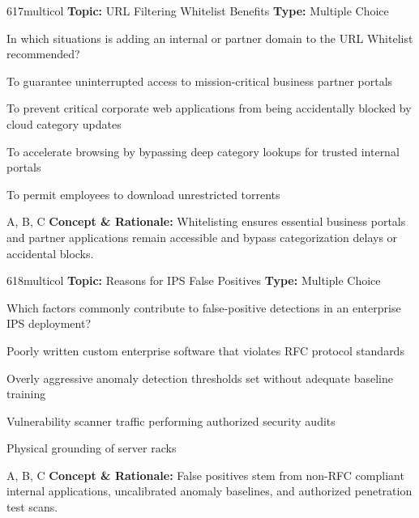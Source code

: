 \begin{qcard}{617}{multicol}
\textcolor{darkslate!75}{\small\textbf{Topic:} URL Filtering Whitelist Benefits \hfill \textbf{Type:} Multiple Choice}\vspace{0.4em}\par
In which situations is adding an internal or partner domain to the URL Whitelist recommended?
\begin{qoptions}
\item To guarantee uninterrupted access to mission-critical business partner portals
\item To prevent critical corporate web applications from being accidentally blocked by cloud category updates
\item To accelerate browsing by bypassing deep category lookups for trusted internal portals
\item To permit employees to download unrestricted torrents
\end{qoptions}
\end{qcard}
\nopagebreak
\begin{explainbox}{A, B, C}
\textbf{Concept \& Rationale:} Whitelisting ensures essential business portals and partner applications remain accessible and bypass categorization delays or accidental blocks.
\end{explainbox}

\begin{qcard}{618}{multicol}
\textcolor{darkslate!75}{\small\textbf{Topic:} Reasons for IPS False Positives \hfill \textbf{Type:} Multiple Choice}\vspace{0.4em}\par
Which factors commonly contribute to false-positive detections in an enterprise IPS deployment?
\begin{qoptions}
\item Poorly written custom enterprise software that violates RFC protocol standards
\item Overly aggressive anomaly detection thresholds set without adequate baseline training
\item Vulnerability scanner traffic performing authorized security audits
\item Physical grounding of server racks
\end{qoptions}
\end{qcard}
\nopagebreak
\begin{explainbox}{A, B, C}
\textbf{Concept \& Rationale:} False positives stem from non-RFC compliant internal applications, uncalibrated anomaly baselines, and authorized penetration test scans.
\end{explainbox}

